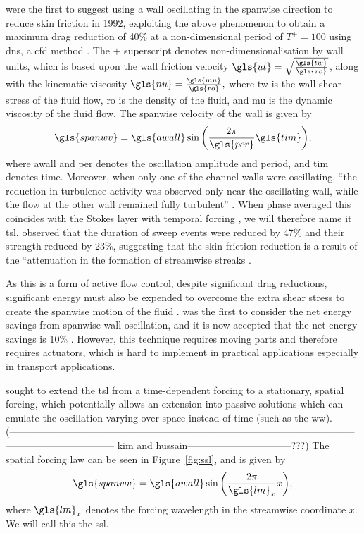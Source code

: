\citeauthor*{jung1992} \cite{jung1992} were the first to suggest using a wall oscillating in the spanwise direction to reduce skin friction in 1992, exploiting the above phenomenon to obtain a maximum drag reduction of 40\% at a non-dimensional period of $T^+=100$ using \gls{dns}, a \gls{cfd} method \cite{karniadakis2003}. The $+$ superscript denotes non-dimensionalisation by wall units, which is based upon the wall friction velocity $\gls{ut}=\sqrt{\frac{\gls{tw}}{\gls{ro}}}$, along with the kinematic viscosity $\gls{nu}=\frac{\gls{mu}}{\gls{ro}},$ where \gls{tw} is the wall shear stress of the fluid flow, \gls{ro} is the density of the fluid, and \gls{mu} is the dynamic viscosity of the fluid flow. The spanwise velocity of the wall is given by
\begin{equation}
	\gls{spanwv} = \gls{awall}\sin{\left( \frac{2\pi}{\gls{per}}\gls{tim} \right)}
,\end{equation}
where \gls{awall} and \gls{per} denotes the oscillation amplitude and period, and \gls{tim} denotes time.
Moreover, when only one of the channel walls were oscillating, ``the reduction in turbulence activity was observed only near the oscillating wall, while the flow at the other wall remained fully turbulent'' \cite{jung1992}. When phase averaged this coincides with the Stokes layer with temporal forcing \cite{viotti2009}, we will therefore name it \gls{tsl}. \textcite{dhanak1999} observed that the duration of sweep events were reduced by 47\% and their strength reduced by 23\%, suggesting that the skin-friction reduction is a result of the ``attenuation in the formation of streamwise streaks \cite{karniadakis2003}.

As this is a form of active flow control, despite significant drag reductions, significant energy must also be expended to overcome the extra shear stress to create the spanwise motion of the fluid \cite{viotti2009}. \textcite{baron1996} was the first to consider the net energy savings from spanwise wall oscillation, and it is now accepted that the net energy savings is 10\% \cite{viotti2009, karniadakis2003}. However, this technique requires moving parts and therefore requires actuators, which is hard to implement in practical applications especially in transport applications.

\textcite{viotti2009} sought to extend the \gls{tsl} from a time-dependent forcing to a stationary, spatial forcing, which potentially allows an extension into passive solutions which can emulate the oscillation varying over space instead of time (such as the \gls{ww}). (------------------------------------------------------------------------------------------------------------------------------------------ kim and hussain--------------------------------???)
The spatial forcing law can be seen in Figure~\ref{fig:ssl}, and is given by
\begin{equation}
	\gls{spanwv} = \gls{awall}\sin{\left( \frac{2\pi}{\gls{lm}_x} x \right)} 
,\end{equation}
where $\gls{lm}_x$ denotes the forcing wavelength in the streamwise coordinate $x$. We will call this the \gls{ssl}.

